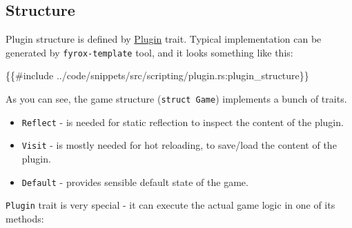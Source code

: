 \documentclass[
]{book}
\newenvironment{Shaded}{\begin{snugshade}}{\end{snugshade}}
\newcommand{\NormalTok}[1]{#1}
\providecommand{\tightlist}{%
  \setlength{\itemsep}{0pt}\setlength{\parskip}{0pt}}
\theoremstyle{definition}
\theoremstyle{definition}
\theoremstyle{definition}
\theoremstyle{definition}
\theoremstyle{remark}
\begin{document}
\subsection{Structure}\label{structure}

Plugin structure is defined by \href{https://docs.rs/fyrox/latest/fyrox/plugin/trait.Plugin.html}{Plugin} trait. Typical implementation can be generated by \texttt{fyrox-template} tool,
and it looks something like this:

\begin{Shaded}
\begin{Highlighting}[]
\NormalTok{\{\{\#include ../code/snippets/src/scripting/plugin.rs:plugin\_structure\}\}}
\end{Highlighting}
\end{Shaded}

As you can see, the game structure (\texttt{struct\ Game}) implements a bunch of traits.

\begin{itemize}
\tightlist
\item
  \texttt{Reflect} - is needed for static reflection to inspect the content of the plugin.
\item
  \texttt{Visit} - is mostly needed for hot reloading, to save/load the content of the plugin.
\item
  \texttt{Default} - provides sensible default state of the game.
\end{itemize}

\texttt{Plugin} trait is very special - it can execute the actual game logic in one of its methods:
\end{document}
